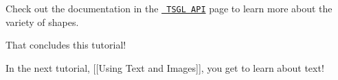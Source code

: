 Check out the documentation in the \href{http://calvin-cs.github.io/TSGL/html/annotated.html}{\texttt{ T\+S\+GL A\+PI}} page to learn more about the variety of shapes.

That concludes this tutorial!

In the next tutorial, \mbox{[}\mbox{[}Using Text and Images\mbox{]}\mbox{]}, you get to learn about text! 